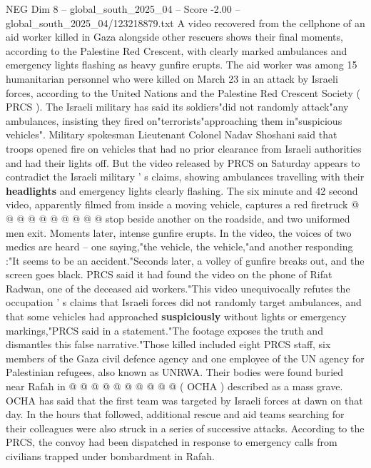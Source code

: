 \begin{textsample}{NEG Dim 8 – global\_south\_2025\_04 – Score -2.00 – global\_south\_2025\_04/123218879.txt}  \label{ex:f8_neg_047}
A video recovered from the cellphone of an aid worker killed in Gaza alongside other rescuers shows their final moments, according to the Palestine Red Crescent, with clearly marked ambulances and emergency lights flashing as heavy gunfire erupts.
The aid worker was among 15 humanitarian personnel who were killed on March 23 in an attack by Israeli forces, according to the United Nations and the Palestine Red Crescent Society ( PRCS ).
The Israeli military has said its soldiers"did not randomly attack"any ambulances, insisting they fired on"terrorists"approaching them in"suspicious vehicles".
Military spokesman Lieutenant Colonel Nadav Shoshani said that troops opened fire on vehicles that had no prior clearance from Israeli authorities and had their lights off.
But the video released by PRCS on Saturday appears to contradict the Israeli military ' s claims, showing ambulances travelling with their \textbf{headlights} and emergency lights clearly flashing.
The six minute and 42 second video, apparently filmed from inside a moving vehicle, captures a red firetruck @ @ @ @ @ @ @ @ @ @ stop beside another on the roadside, and two uniformed men exit.
Moments later, intense gunfire erupts.
In the video, the voices of two medics are heard -- one saying,"the vehicle, the vehicle,"and another responding :"It seems to be an accident."Seconds later, a volley of gunfire breaks out, and the screen goes black.
PRCS said it had found the video on the phone of Rifat Radwan, one of the deceased aid workers."This video unequivocally refutes the occupation ' s claims that Israeli forces did not randomly target ambulances, and that some vehicles had approached \textbf{suspiciously} without lights or emergency markings,"PRCS said in a statement."The footage exposes the truth and dismantles this false narrative."Those killed included eight PRCS staff, six members of the Gaza civil defence agency and one employee of the UN agency for Palestinian refugees, also known as UNRWA.
Their bodies were found buried near Rafah in @ @ @ @ @ @ @ @ @ @ ( OCHA ) described as a mass grave.
OCHA has said that the first team was targeted by Israeli forces at dawn on that day.
In the hours that followed, additional rescue and aid teams searching for their colleagues were also struck in a series of successive attacks.
According to the PRCS, the convoy had been dispatched in response to emergency calls from civilians trapped under bombardment in Rafah.

\end{textsample}
